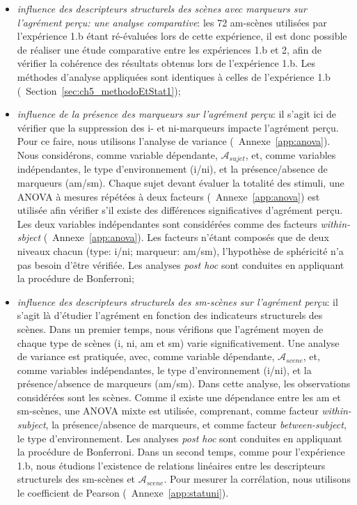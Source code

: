 \begin{itemize}
\item \emph{influence des descripteurs structurels des scènes avec marqueurs sur l'agrément perçu: une analyse comparative}: les 72 am-scènes utilisées par l'expérience 1.b étant ré-évaluées lors de cette expérience, il est donc possible de réaliser une étude comparative entre les expériences 1.b et 2, afin de vérifier la cohérence des résultats obtenus lors de l'expérience 1.b. Les méthodes d'analyse appliquées sont identiques à celles de l'expérience 1.b (\cf~Section~\ref{sec:ch5_methodoEtStat1});
\item \emph{influence de la présence des marqueurs sur l'agrément perçu}: il s'agit ici de vérifier que la suppression des i- et ni-marqueurs impacte l'agrément perçu. Pour ce faire, nous utilisons l'analyse de variance (\cf~Annexe~\ref{app:anova}). Nous considérons, comme variable dépendante,  $\mathcal{A}_{sujet}$, et, comme variables indépendantes, le type d'environnement (i/ni), et la présence/absence de marqueurs (am/sm). Chaque sujet devant évaluer la totalité des stimuli, une ANOVA à mesures répétées à deux facteurs (\cf~Annexe~\ref{app:anova}) est utilisée afin vérifier s'il existe des différences significatives d'agrément perçu. Les deux variables indépendantes sont considérées comme des facteurs \emph{within-sbject} (\cf~Annexe~\ref{app:anova}). Les facteurs n'étant composés que de deux niveaux chacun (type: i/ni; marqueur: am/sm), l'hypothèse de sphéricité n'a pas besoin d'être vérifiée. Les analyses \emph{post hoc} sont conduites en appliquant la procédure de Bonferroni;
\item \emph{influence des descripteurs structurels des sm-scènes sur l'agrément perçu}: il s'agit là d'étudier l'agrément en fonction des indicateurs structurels des scènes. Dans un premier temps, nous vérifions que l'agrément moyen de chaque type de scènes (i, ni, am et sm) varie significativement. Une analyse de variance est pratiquée, avec, comme variable dépendante,  $\mathcal{A}_{scene}$, et, comme variables indépendantes, le type d'environnement (i/ni), et la présence/absence de marqueurs (am/sm). Dans cette analyse, les observations considérées sont les scènes. Comme il existe une dépendance entre les am et sm-scènes, une ANOVA mixte est utilisée, comprenant, comme facteur \emph{within-subject}, la présence/absence de marqueurs, et comme facteur \emph{between-subject}, le type d'environnement. Les analyses \emph{post hoc} sont conduites en appliquant la procédure de Bonferroni. Dans un second temps, comme pour l'expérience 1.b, nous étudions l'existence de relations linéaires entre les descripteurs structurels des sm-scènes et $\mathcal{A}_{scene}$. Pour mesurer la corrélation, nous utilisons le coefficient de Pearson (\cf~Annexe~\ref{app:statuni}).
\end{itemize}

